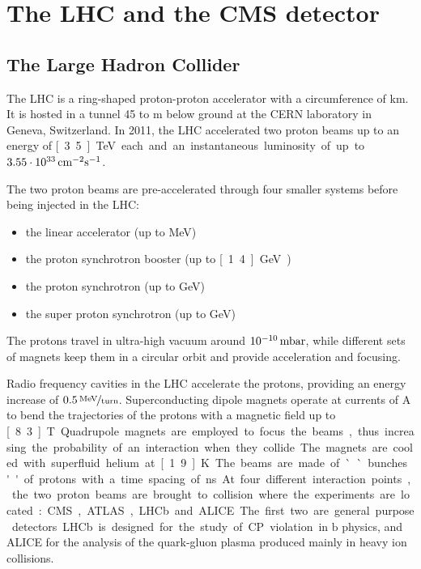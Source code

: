 \chapter{The LHC and the CMS detector}
\section{The Large Hadron Collider}
The LHC is a ring-shaped proton-proton accelerator with a circumference of
\unit[27]{km}. It is hosted in a tunnel 45 to \unit[170]{m} below ground at
the CERN laboratory in Geneva, Switzerland. In 2011, the LHC accelerated two
proton beams up to an energy of \unit[3.5]{TeV} each and an instantaneous
luminosity of up to $\unit[3.55\cdot 10^{33}]{cm^{-2}s^{-1}}$.

The two proton beams are pre-accelerated through four smaller systems before
being injected in the LHC:
\begin{itemize}
    \item the linear accelerator (up to \unit[50]{MeV})
    \item the proton synchrotron booster (up to \unit[1.4]{GeV})
    \item the proton synchrotron (up to \unit[26]{GeV})
    \item the super proton synchrotron (up to \unit[450]{GeV})
\end{itemize}

The protons travel in ultra-high vacuum around
$\unit[10^{-10}]{mbar}$, while different sets of magnets keep them in a
circular orbit and provide acceleration and focusing.

Radio frequency cavities in the LHC accelerate the protons, providing an energy
increase of $\unitfrac[0.5]{MeV}{turn}$.
Superconducting dipole magnets operate at currents of \unit[11850]{A} to bend the trajectories
of the protons with a magnetic field up to \unit[8.3]{T}.
Quadrupole magnets are employed to focus the beams, thus increasing the
probability of an interaction when they collide.
The magnets are cooled with superfluid helium at \unit[1.9]{K}.
The beams are made of ``bunches'' of protons with a time spacing of
\unit[75]{ns}.

At four different interaction points, the two proton beams are brought to
collision where the experiments are located: CMS, ATLAS, LHCb and ALICE.
The first two are general purpose detectors. LHCb is designed for the study
of CP violation in $\mathrm{b}$ physics, and ALICE for the analysis of the
quark-gluon plasma produced mainly in heavy ion collisions.

